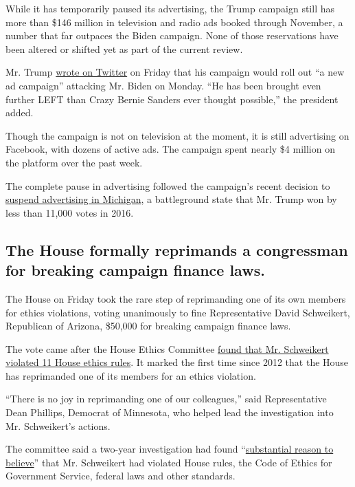 While it has temporarily paused its advertising, the Trump campaign
still has more than \$146 million in television and radio ads booked
through November, a number that far outpaces the Biden campaign. None of
those reservations have been altered or shifted yet as part of the
current review.

Mr. Trump
\href{https://twitter.com/realDonaldTrump/status/1289275311272521728}{wrote
on Twitter} on Friday that his campaign would roll out ``a new ad
campaign'' attacking Mr. Biden on Monday. ``He has been brought even
further LEFT than Crazy Bernie Sanders ever thought possible,'' the
president added.

Though the campaign is not on television at the moment, it is still
advertising on Facebook, with dozens of active ads. The campaign spent
nearly \$4 million on the platform over the past week.

The complete pause in advertising followed the campaign's recent
decision to
\href{https://www.nytimes.com/2020/07/29/us/politics/michigan-trump-biden-2020.html}{suspend
advertising in Michigan}, a battleground state that Mr. Trump won by
less than 11,000 votes in 2016.

\hypertarget{the-house-formally-reprimands-a-congressman-for-breaking-campaign-finance-laws}{%
\subsection{The House formally reprimands a congressman for breaking
campaign finance
laws.}\label{the-house-formally-reprimands-a-congressman-for-breaking-campaign-finance-laws}}

The House on Friday took the rare step of reprimanding one of its own
members for ethics violations, voting unanimously to fine Representative
David Schweikert, Republican of Arizona, \$50,000 for breaking campaign
finance laws.

The vote came after the House Ethics Committee
\href{https://www.nytimes.com/2020/07/30/us/david-schweikert-ethics-rules-violations.html}{found
that Mr. Schweikert violated 11 House ethics rules}. It marked the first
time since 2012 that the House has reprimanded one of its members for an
ethics violation.

``There is no joy in reprimanding one of our colleagues,'' said
Representative Dean Phillips, Democrat of Minnesota, who helped lead the
investigation into Mr. Schweikert's actions.

The committee said a two-year investigation had found
``\href{https://ethics.house.gov/press-releases/statement-chairman-and-ranking-member-committee-ethics-regarding-representative-13}{substantial
reason to believe}'' that Mr. Schweikert had violated House rules, the
Code of Ethics for Government Service, federal laws and other standards.

